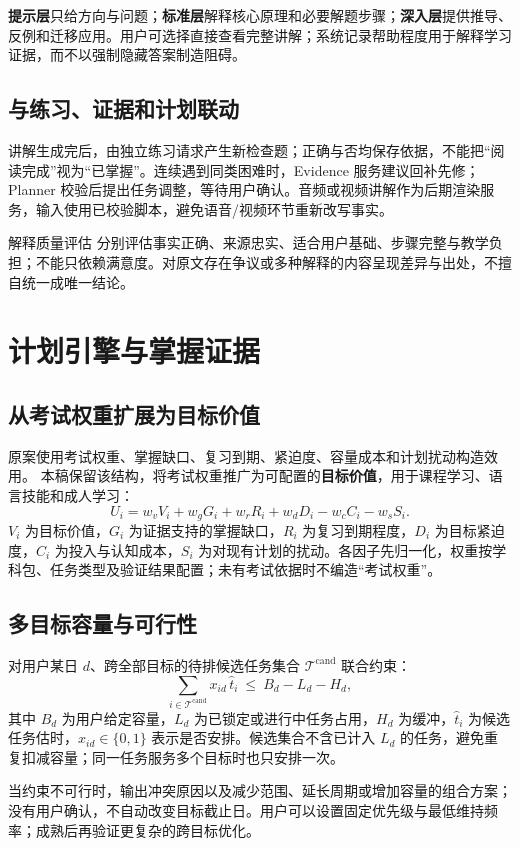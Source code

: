 \documentclass[UTF8,a4paper,11pt,fontset=none]{ctexart}
\newcommand{\newsec}[1]{\clearpage\section{#1}}
\begin{document}
\textbf{提示层}只给方向与问题；\textbf{标准层}解释核心原理和必要解题步骤；\textbf{深入层}提供推导、反例和迁移应用。用户可选择直接查看完整讲解；系统记录帮助程度用于解释学习证据，而不以强制隐藏答案制造阻碍。

\subsection{与练习、证据和计划联动}
讲解生成完后，由独立练习请求产生新检查题；正确与否均保存依据，不能把“阅读完成”视为“已掌握”。连续遇到同类困难时，Evidence 服务建议回补先修；Planner 校验后提出任务调整，等待用户确认。音频或视频讲解作为后期渲染服务，输入使用已校验脚本，避免语音/视频环节重新改写事实。

\begin{caution}{解释质量评估}
分别评估事实正确、来源忠实、适合用户基础、步骤完整与教学负担；不能只依赖满意度。对原文存在争议或多种解释的内容呈现差异与出处，不擅自统一成唯一结论。
\end{caution}

\newsec{计划引擎与掌握证据}
\subsection{从考试权重扩展为目标价值}
原案使用考试权重、掌握缺口、复习到期、紧迫度、容量成本和计划扰动构造效用。\cite{original} 本稿保留该结构，将考试权重推广为可配置的\textbf{目标价值}，用于课程学习、语言技能和成人学习：
\[
U_i=w_vV_i+w_gG_i+w_rR_i+w_dD_i-w_cC_i-w_sS_i.
\]
$V_i$ 为目标价值，$G_i$ 为证据支持的掌握缺口，$R_i$ 为复习到期程度，$D_i$ 为目标紧迫度，$C_i$ 为投入与认知成本，$S_i$ 为对现有计划的扰动。各因子先归一化，权重按学科包、任务类型及验证结果配置；未有考试依据时不编造“考试权重”。

\subsection{多目标容量与可行性}
对用户某日 $d$、跨全部目标的待排候选任务集合 $\mathcal{T}^{\mathrm{cand}}$ 联合约束：
\[
\sum_{i\in\mathcal{T}^{\mathrm{cand}}}x_{id}\,\widehat t_i\ \leq\ B_d-L_d-H_d,
\]
其中 $B_d$ 为用户给定容量，$L_d$ 为已锁定或进行中任务占用，$H_d$ 为缓冲，$\widehat t_i$ 为候选任务估时，$x_{id}\in\{0,1\}$ 表示是否安排。候选集合不含已计入 $L_d$ 的任务，避免重复扣减容量；同一任务服务多个目标时也只安排一次。

当约束不可行时，输出冲突原因以及减少范围、延长周期或增加容量的组合方案；没有用户确认，不自动改变目标截止日。用户可以设置固定优先级与最低维持频率；成熟后再验证更复杂的跨目标优化。
\end{document}
